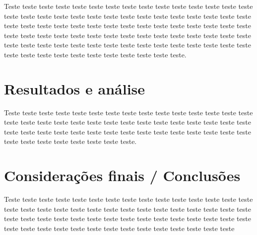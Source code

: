 \documentclass[12pt]{article}
\begin{document}
  Teste teste teste teste teste teste teste teste teste teste teste teste teste teste teste teste teste teste teste teste teste teste teste teste teste teste teste teste teste teste teste teste teste teste teste teste teste teste teste teste teste teste teste teste teste teste teste teste teste teste teste teste teste teste teste teste teste teste teste teste teste teste teste teste teste teste teste teste teste teste teste teste teste teste teste teste teste teste teste teste teste teste teste teste teste teste.

  \section{Resultados e análise}

 Teste teste teste teste teste teste teste teste teste teste teste teste teste teste teste teste teste teste teste teste teste teste teste teste teste teste teste teste teste teste teste teste teste teste teste teste teste teste teste teste teste teste teste teste teste teste teste teste teste teste teste teste teste.

\section{Considerações finais / Conclusões}
 
  Teste teste teste teste teste teste teste teste teste teste teste teste teste teste teste teste teste teste teste teste teste teste teste teste teste teste teste teste teste teste teste teste teste teste teste teste teste teste teste teste teste teste teste teste teste teste teste teste teste teste teste teste teste teste teste teste teste teste teste

  \printbibliography[title={REFERÊNCIAS}]

\reiniciaAlfa %

\label{ape:ProgramaPython}
\end{document}
